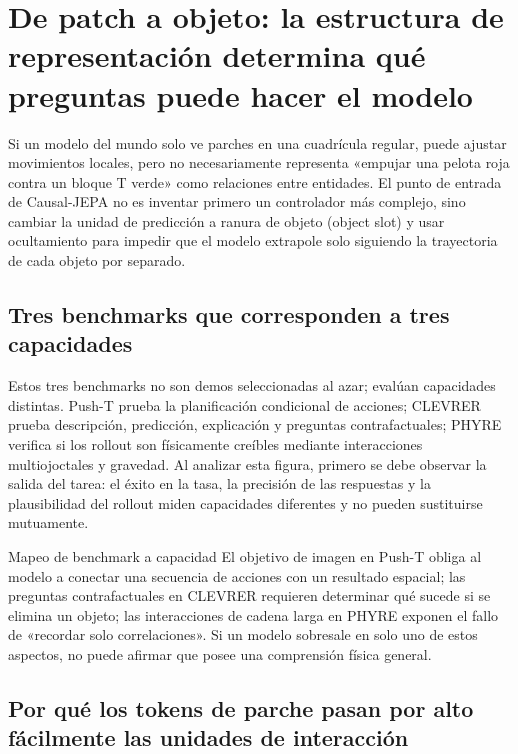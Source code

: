 \section{De patch a objeto: la estructura de representación determina qué preguntas puede hacer el modelo}

Si un modelo del mundo solo ve parches en una cuadrícula regular, puede ajustar movimientos locales, pero no necesariamente representa «empujar una pelota roja contra un bloque T verde» como relaciones entre entidades. El punto de entrada de Causal-JEPA no es inventar primero un controlador más complejo, sino cambiar la unidad de predicción a ranura de objeto (object slot) y usar ocultamiento para impedir que el modelo extrapole solo siguiendo la trayectoria de cada objeto por separado.

\subsection{Tres benchmarks que corresponden a tres capacidades}

Estos tres benchmarks no son demos seleccionadas al azar; evalúan capacidades distintas. Push-T prueba la planificación condicional de acciones; CLEVRER prueba descripción, predicción, explicación y preguntas contrafactuales; PHYRE verifica si los rollout son físicamente creíbles mediante interacciones multiojoctales y gravedad. Al analizar esta figura, primero se debe observar la salida del tarea: el éxito en la tasa, la precisión de las respuestas y la plausibilidad del rollout miden capacidades diferentes y no pueden sustituirse mutuamente.


\begin{knowledgebox}{Mapeo de benchmark a capacidad}
El objetivo de imagen en Push-T obliga al modelo a conectar una secuencia de acciones con un resultado espacial; las preguntas contrafactuales en CLEVRER requieren determinar qué sucede si se elimina un objeto; las interacciones de cadena larga en PHYRE exponen el fallo de «recordar solo correlaciones». Si un modelo sobresale en solo uno de estos aspectos, no puede afirmar que posee una comprensión física general.
\end{knowledgebox}

\subsection{Por qué los tokens de parche pasan por alto fácilmente las unidades de interacción}

